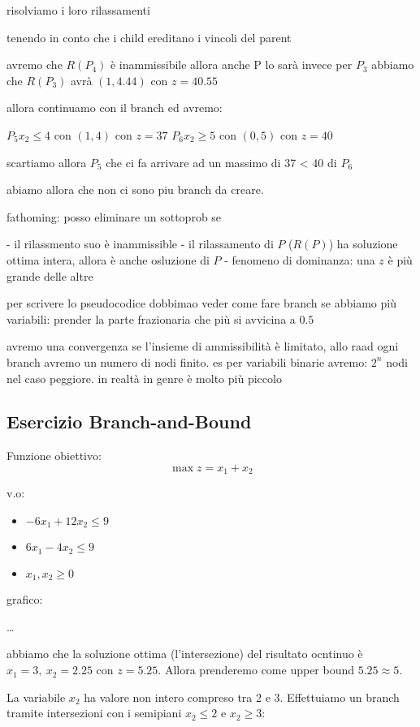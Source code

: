 risolviamo i loro rilassamenti 

tenendo in conto che i child ereditano i vincoli del parent


avremo che $R(P_4)$ è inammissibile allora anche P lo sarà
invece per $P_3$ abbiamo che $R(P_3)$ avrà $(1, 4.44)$ con $z = 40.55$

allora continuamo con il branch ed avremo:

$P_5 x_2 \leq 4$ con $(1, 4)$ con $z = 37$
$P_6 x_2 \geq 5$ con $(0, 5)$ con $z = 40$

scartiamo allora $P_5$ che ci fa arrivare ad un massimo di 37 < 40 di $P_6$

abiamo allora che non ci sono piu branch da creare.

fathoming: posso eliminare un sottoprob se

- il rilassmento suo è inammissible
- il rilassamento di $P$ ($R(P)$) ha soluzione ottima intera, allora è anche osluzione di $P$
- fenomeno di dominanza: una $z$ è più grande delle altre


per scrivere lo pseudocodice dobbimao veder come fare branch se abbiamo più variabili: prender la parte frazionaria che più si avvicina a $0.5$


avremo una convergenza se l'insieme di ammissibilità è limitato, allo raad ogni branch avremo un numero di nodi finito. es per variabili binarie avremo: $2^n$ nodi nel caso peggiore. in realtà in genre è molto più piccolo


\subsection{Esercizio Branch-and-Bound}

Funzione obiettivo:
$$\max z = x_1 + x_2$$

v.o:

\begin{itemize}
    \item $-6x_1 + 12x_2 \leq 9$
    \item $6x_1 - 4x_2 \leq 9$
    \item $x_1, x_2 \geq 0$
\end{itemize}

grafico:

\dots

abbiamo che la soluzione ottima (l'intersezione) del risultato ocntinuo è $x_1 = 3,\ x_2 = 2.25$ con $z = 5.25$. Allora prenderemo come upper bound $5.25 \approx 5$.

La variabile $x_2$ ha valore non intero compreso tra 2 e 3. Effettuiamo un branch tramite intersezioni con i semipiani $x_2 \leq 2$ e $x_2 \geq 3$:

